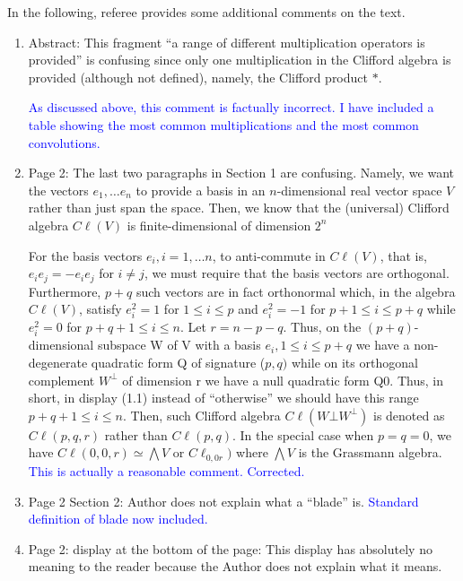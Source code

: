 \documentclass{article}
\newcommand{\cliff}[1]{\ensuremath{C\ell\left(#1\right)}}
\begin{document}
In the following, referee provides some additional comments on the text.

\begin{enumerate}
  \item Abstract: This fragment “a range of different multiplication operators is provided” is confusing since only one multiplication in the Clifford algebra is provided (although not defined),
    namely, the Clifford product $*$.

    \textcolor{blue}{As discussed above, this comment is factually
      incorrect. I have included a table showing the most common
      multiplications and the most common convolutions.    }


\item Page 2: The last two paragraphs in Section 1 are confusing.
  Namely, we want the vectors $e_1,\ldots e_n$ to provide a basis in
  an $n$-dimensional real vector space $V$ rather than just span the
  space.  Then, we know that the (universal) Clifford algebra
  \cliff{V} is finite-dimensional of dimension $2^n$

  For the basis vectors $e_i , i = 1, \ldots n$, to anti-commute in
  \cliff{V}, that is, $e_i e_j = -e_i e_j$ for $i\neq j$, we must
  require that the basis vectors are orthogonal.  Furthermore, $p + q$
  such vectors are in fact orthonormal which, in the algebra
  \cliff{V}, satisfy $e_i^2 = 1$ for $1\leq i\leq p$ and $e_i^2 = -1$
  for $p+1\leq i\leq p+q$ while $e_i^2 = 0$ for $p + q + 1 \leq i\leq
  n$.  Let $r=n-p-q$.  Thus, on the $(p + q)$-dimensional subspace W
  of V with a basis $e_i, 1\leq i \leq p+q$ we have a non-degenerate
  quadratic form Q of signature ($p, q)$ while on its orthogonal
  complement $W^\bot$ of dimension r we have a null quadratic form
  Q0. Thus, in short, in display (1.1) instead of “otherwise” we
  should have this range $p + q + 1 \leq i \leq n$.  Then, such
  Clifford algebra \cliff{W\bot W^\bot} is denoted as \cliff{p,q,r}
  rather than \cliff{p,q}. In the special case when $p = q = 0$, we
  have $\cliff{0,0,r}\simeq\bigwedge V$ or $C\ell_{0,0r})$ where
  $\bigwedge V$ is the Grassmann algebra.
  \textcolor{blue}{This is actually a reasonable comment.  Corrected.}

\item  Page 2 Section 2: Author does not
  explain what a “blade” is.
  \textcolor{blue}{Standard definition of blade now included.}
  \item Page 2: display at the bottom of the
page: This display has absolutely no meaning to the reader because the
Author does not explain what it means.


\end{enumerate}
\end{document}
